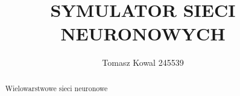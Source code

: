\documentclass[12pt,a4paper]{article}
\title{SYMULATOR SIECI NEURONOWYCH}
\author{Tomasz Kowal 245539}
\date{}
\begin{document}
	\maketitle

	\begin{abstract}
		Wielowarstwowe sieci neuronowe
	\end{abstract}

	\section{}\label{sec:Wstęp}
	
	\section{}\label{sec:Cel i zakres}

	\section{}\label{sec:Wstęp teoretyczny, przegląd aktualnego stanu wiedzy}

	\section{}\label{sec:Metodyka badawcza i użyte materiały}
	
	\section{}\label{sec:Opis wyników i ich analiza}
	
	\section{}\label{sec:Dyskusja wyników badań}
	
	\section{}\label{sec:Wnioski}
	
	\section{}\label{sec:Bibliografia}
	
\end{document}
